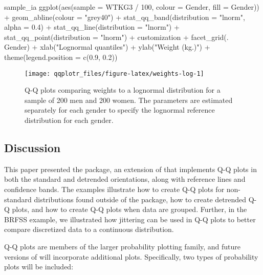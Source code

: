 \begin{Schunk}
\begin{Sinput}
sample_ia %>% 
  ggplot(aes(sample = WTKG3 / 100, colour = Gender, fill = Gender)) +
  geom_abline(colour = "grey40") +
  stat_qq_band(distribution = "lnorm", alpha = 0.4) +
  stat_qq_line(distribution = "lnorm") +
  stat_qq_point(distribution = "lnorm") +
  customization +
  facet_grid(. ~ Gender) +
  xlab("Lognormal quantiles") +
  ylab("Weight (kg.)") +
  theme(legend.position = c(0.9, 0.2))
\end{Sinput}
\begin{figure}

{\centering \texttt{[image: qqplotr\_files/figure-latex/weights-log-1]} 

}

\caption[Q-Q plots comparing weights to a lognormal distribution for a sample of 200 men and 200 women]{Q-Q plots comparing weights to a lognormal distribution for a sample of 200 men and 200 women. The parameters are estimated separately for each gender to specify the lognormal reference distribution for each gender.}\label{fig:weights-log}
\end{figure}
\end{Schunk}

\subsection{Discussion}\label{discussion}



This paper presented the  package, an extension of
 that implements Q-Q plots in both the standard and
detrended orientations, along with reference lines and confidence bands.
The examples illustrate how to create Q-Q plots for non-standard
distributions found outside of the  package, how to create
detrended Q-Q plots, and how to create Q-Q plots when data are grouped.
Further, in the BRFSS example, we illustrated how jittering can be used
in Q-Q plots to better compare discretized data to a continuous
distribution.

Q-Q plots are members of the larger probability plotting family, and
future versions of  will incorporate additional plots.
Specifically, two types of probability plots will be included:

